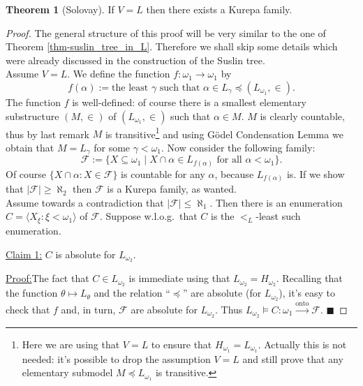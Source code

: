 \documentclass[12pt,a4paper]{report}
\theoremstyle{definition}
\newtheorem{theorem}{Theorem}[chapter] %
\theoremstyle{num.custom-title}
\newenvironment{claim}[1]{\par\noindent\underline{Claim#1:}\space}{} %
\newenvironment{claimproof}[1]{\par\noindent\underline{Proof:}\space#1}{\leavevmode\unskip\penalty9999 \hbox{}\nobreak\hfill\quad\hbox{$\blacksquare$}} %
\DeclareMathOperator{\sse}{\subseteq}
\newcommand{\F}{\mathcal{F}}
\newcommand{\onto}{\xrightarrow{\text{onto}}}
\begin{document}
\begin{theorem}[Solovay]
If $V=L$ then there exists a Kurepa family.
\begin{proof}
The general structure of this proof will be very similar to the one of Theorem \ref{thm-suslin_tree_in_L}. Therefore we shall skip some details which were already discussed in the construction of the Suslin tree.\\
Assume $V=L$. We define the function $f \colon \omega_1 \to \omega_1$ by
\[
f(\alpha) := \text{the least $\gamma$ such that } \alpha \in L_\gamma \preceq (L_{\omega_1}, \in).
\]
The function $f$ is well-defined: of course there is a smallest elementary substructure $(M,\in)$ of $(L_{\omega_1},\in)$ such that $\alpha \in M$. $M$ is clearly countable, thus by last remark $M$ is transitive\footnote{Here we are using that $V=L$ to ensure that $H_{\omega_1} = L_{\omega_1}$. Actually this is not needed: it's possible to drop the assumption $V=L$ and still prove that any elementary submodel $M \preceq L_{\omega_1}$ is transitive.} and using Gödel Condensation Lemma we obtain that $M=L_\gamma$ for some $\gamma < \omega_1$. Now consider the following family:
\[
\F := \{ X \sse \omega_1 \mid X \cap \alpha \in L_{f(\alpha)} \text{ for all } \alpha < \omega_1 \}.
\]
Of course $\{ X \cap \alpha : X \in \F \}$ is countable for any $\alpha$, because $L_{f(\alpha)}$ is. If we show that $|\F| \geq \aleph_2$ then $\F$ is a Kurepa family, as wanted.\\
Assume towards a contradiction that $|\F| \leq \aleph_1$. Then there is an enumeration $C = \langle X_\xi : \xi < \omega_1 \rangle$ of $\F$. Suppose w.l.o.g.\ that $C$ is the $<_L$-least such enumeration.

\begin{claim}{ 1}
$C$ is absolute for $L_{\omega_2}$.
\begin{claimproof}
The fact that $C \in L_{\omega_2}$ is immediate using that $L_{\omega_2} = H_{\omega_2}$. Recalling that the function $\theta \mapsto L_\theta$ and the relation ``$\preceq$'' are absolute (for $L_{\omega_2}$), it's easy to check that $f$ and, in turn, $\F$ are absolute for $L_{\omega_2}$. Thus $L_{\omega_2} \models C \colon \omega_1 \onto \F$.
\end{claimproof}
\end{claim}


\end{proof}
\end{theorem}
\end{document}

